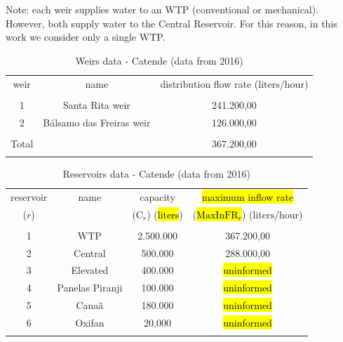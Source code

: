 \documentclass{singlecol}
\theoremstyle{TH}{
\newtheorem{lemma}{Lemma}
\newtheorem{theorem}[lemma]{Theorem}
\newtheorem{corrolary}[lemma]{Corrolary}
\newtheorem{conjecture}[lemma]{Conjecture}
\newtheorem{proposition}[lemma]{Proposition}
\newtheorem{claim}[lemma]{Claim}
\newtheorem{stheorem}[lemma]{Wrong Theorem}
\newtheorem{algorithm}{Algorithm}
}
\theoremstyle{THrm}{
\newtheorem{definition}{Definition}[section]
\newtheorem{question}{Question}[section]
\newtheorem{remark}{Remark}
\newtheorem{scheme}{Scheme}
}
\theoremstyle{THhit}{
\newtheorem{case}{Case}[section]
}
\begin{document}
\noindent Note: each weir supplies water to an WTP (conventional or mechanical). However, both supply water to the Central Reservoir. For this reason, in this work we consider only a single WTP. 

\begin{table}[H]
\begin{center}
	\begin{tabular}{ c  c  c } 
		weir      & name        & distribution flow rate  ($\mathrm{liters/hour}$)     \\
		                                                                    \\
		1              & Santa Rita weir            & 241.200,00          \\
		2              & Bálsamo das Freiras  weir  & 126.000,00         \\
							                                                \\
		\hline
		Total          &                               & 367.200,00         \\
		\\
	\end{tabular}
\caption{Weirs data - Catende (data from 2016)}
\label{tab:weirsCatende}
\end{center}
\end{table}

\begin{table}[H]
\begin{center}
	\begin{tabular}{ c  c  c  c } 
		reservoir      & name              & capacity                       & \hl{maximum inflow rate}    \\
		($r$)          &             	   &  ($\mathrm{C}_{r}$) (\hl{liters})    &  (\hl{$\mathrm{MaxInFR}_{r}$}) ($\mathrm{liters/hour}$) \\
		\\
		1              & WTP               & 2.500.000            &  367.200,00   \\
		2              & Central           &   500.000 		&  288.000,00   \\
		3              & Elevated          &   400.000            & \hl{uninformed} \\
		4              & Panelas Piranji   &   100.000            & \hl{uninformed} \\
		5              & Canaã             &   180.000            & \hl{uninformed} \\
		6              & Oxifan            &    20.000            & \hl{uninformed} \\
		\\
	\end{tabular}
\caption{Reservoirs data - Catende (data from 2016)}
\label{tab:reservoirsCatende}
\end{center}
\end{table}
\end{document}
